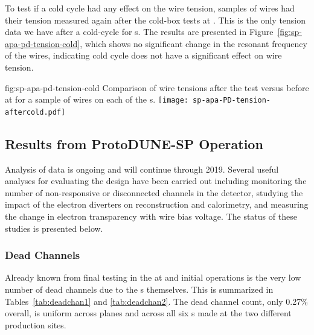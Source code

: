 To test if a cold cycle had any effect on the wire tension, samples of wires had their tension measured again after the cold-box tests at . This is the only tension data we have after a cold-cycle for  s. The results are presented in Figure~\ref{fig:sp-apa-pd-tension-cold}, which shows no significant change in the resonant frequency of the wires, indicating cold cycle does not have a significant effect on wire tension.

\begin{dunefigure}{fig:sp-apa-pd-tension-cold}
{Comparison of wire tensions after the \coldbox test versus before at  for a sample of wires on each of the  s.}
\texttt{[image: sp-apa-PD-tension-aftercold.pdf]} 
\end{dunefigure}



\subsection{Results from ProtoDUNE-SP Operation}
\label{sec:fdsp-apa-qa-protodune-ops}


Analysis of  data is ongoing and will continue through 2019.  Several useful analyses for evaluating the  design have been carried out including monitoring the number of non-responsive or disconnected channels in the detector, studying the impact of the electron diverters on reconstruction and calorimetry, and measuring the change in electron transparency with wire bias voltage.  The status of these studies is presented below.   


\subsubsection{Dead Channels}
\label{sec:fdsp-apa-qa-protodune-ops-dead-channels}


Already known from final testing in the \coldbox at  and initial operations is the very low number of dead channels due to the s themselves.  This is summarized in Tables~\ref{tab:deadchan1} and \ref{tab:deadchan2}.  The dead channel count, only 0.27\% overall, is uniform across planes and across all six s made at the two different production sites.   

